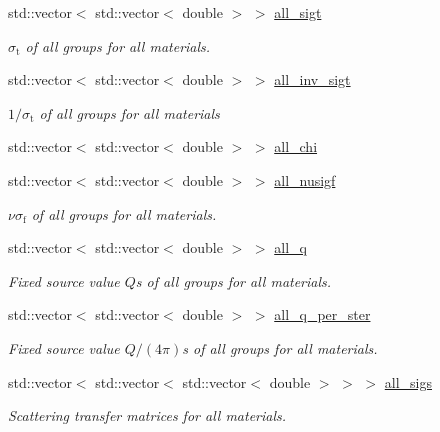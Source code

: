 \begin{DoxyCompactItemize}
std\+::vector$<$ std\+::vector$<$ double $>$ $>$ \hyperlink{class_material_properties_ac2a59b00e3be0e775249354182ae08a4}{all\+\_\+sigt}
\begin{DoxyCompactList}\small\item\em $\sigma_\mathrm{t}$ of all groups for all materials. \end{DoxyCompactList}\item 
std\+::vector$<$ std\+::vector$<$ double $>$ $>$ \hyperlink{class_material_properties_a9cf448a469e554386e3313d7db0ed4b5}{all\+\_\+inv\+\_\+sigt}
\begin{DoxyCompactList}\small\item\em $1/\sigma_\mathrm{t}$ of all groups for all materials \end{DoxyCompactList}\item 
std\+::vector$<$ std\+::vector$<$ double $>$ $>$ \hyperlink{class_material_properties_afb25f14545f97c91dacfffcae9d0dcf3}{all\+\_\+chi}
\item 
std\+::vector$<$ std\+::vector$<$ double $>$ $>$ \hyperlink{class_material_properties_ac20f8acc8fb9dd7ef9805eff006f4710}{all\+\_\+nusigf}
\begin{DoxyCompactList}\small\item\em $\nu\sigma_\mathrm{f}$ of all groups for all materials. \end{DoxyCompactList}\item 
std\+::vector$<$ std\+::vector$<$ double $>$ $>$ \hyperlink{class_material_properties_a63087272811561aa476e594b6aa6f4a9}{all\+\_\+q}
\begin{DoxyCompactList}\small\item\em Fixed source value $Q$\textquotesingle{}s of all groups for all materials. \end{DoxyCompactList}\item 
std\+::vector$<$ std\+::vector$<$ double $>$ $>$ \hyperlink{class_material_properties_a6ca548f222ef27140c7fc1876c97e6aa}{all\+\_\+q\+\_\+per\+\_\+ster}
\begin{DoxyCompactList}\small\item\em Fixed source value $Q/(4\pi)$\textquotesingle{}s of all groups for all materials. \end{DoxyCompactList}\item 
std\+::vector$<$ std\+::vector$<$ std\+::vector$<$ double $>$ $>$ $>$ \hyperlink{class_material_properties_a786a421a5a5c61a203b7517e7bafa829}{all\+\_\+sigs}
\begin{DoxyCompactList}\small\item\em Scattering transfer matrices for all materials. \end{DoxyCompactList}\item 

\end{DoxyCompactItemize}
